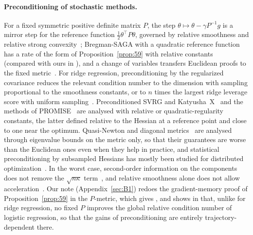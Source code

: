 \paragraph{Preconditioning of stochastic methods.}
For a fixed symmetric positive definite matrix $P$, the step $\theta\mapsto\theta-\gamma P^{-1}g$ is a mirror step for
the reference function $\frac12\theta^\top P\theta$, governed by relative smoothness and relative strong
convexity~\cite{lu2018relatively,bauschke2017descent}; Bregman-SAGA with a quadratic reference function has a rate of
the form of Proposition~\ref{prop:59} with relative constants~\cite{dragomir2021fast} (compared with ours in
), and a change of variables transfers
Euclidean proofs to the fixed metric~\cite{kolte2015accelerating,gonen2016solving}. For ridge regression,
preconditioning by the regularized covariance reduces the relevant condition number to the dimension with sampling
proportional to the smoothness constants, or to $n$ times the largest ridge leverage score with uniform
sampling~\cite{gonen2016solving}. Preconditioned SVRG and Katyusha~X~\cite{liu2019acceleration} and the methods of
PROMISE~\cite{frangella2024promise} are analysed with relative or quadratic-regularity constants, the latter defined
relative to the Hessian at a reference point and close to one near the optimum. Quasi-Newton and diagonal
metrics~\cite{byrd2016stochastic,moritz2016linearly,sadiev2024stochastic} are analysed through eigenvalue bounds on the
metric only, so that their guarantees are worse than the Euclidean ones even when they help in practice, and
statistical preconditioning by subsampled Hessians has mostly been studied for distributed
optimization~\cite{shamir2014communication,hendrikx2020statistically}. In the worst case, second-order information on
the components does not remove the $\sqrt{n\kappa}$ term~\cite{arjevani2017oracle}, and relative smoothness alone does
not allow acceleration~\cite{dragomir2022optimal}. Our note (Appendix~\ref{sec:B1}) redoes the gradient-memory proof of
Proposition~\ref{prop:59} in the $P$-metric, which gives , and shows in
 that, unlike for ridge regression, no fixed $P$ improves the global relative condition
number of logistic regression, so that the gains of preconditioning are entirely trajectory-dependent there.
